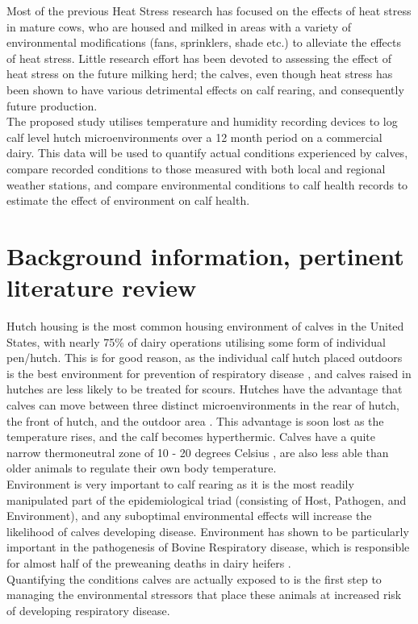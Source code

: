 \documentclass[12pt]{article}
\begin{document}
	Most of the previous Heat Stress research has focused on the effects of heat stress in mature cows, who are housed and milked in areas with a variety of environmental modifications (fans, sprinklers, shade etc.)  to alleviate the effects of heat stress.\cite{Armstrong1994}
	Little research effort has been devoted to assessing the effect of heat stress on the future milking herd; the calves, even though heat stress has been shown to have various detrimental effects on calf rearing, and consequently future production. \cite{Stott1976,lacetera1994,Hoffman1997}\\


	The proposed study utilises temperature and humidity recording devices to log calf level hutch microenvironments over a 12 month period on a commercial dairy. This data will be used to quantify actual conditions experienced by calves, compare recorded conditions to those measured with both local and regional weather stations, and compare environmental conditions to calf health records to estimate the effect of environment on calf health. 

	\newpage
	\section{Background information, pertinent literature review}
	Hutch housing is the most common housing environment of calves in the United States, with nearly 75\% of dairy operations utilising some form of individual pen/hutch.\cite{NAHMS2007}
	This is for good reason, as the individual calf hutch placed outdoors is the best environment for prevention of respiratory disease \cite{callan2002biosecurity}, and calves raised in hutches are less likely to be treated for scours. \cite{Waltner-Toews1986}
	Hutches have the advantage that calves can move between three distinct microenvironments in the rear of hutch, the front of hutch, and the outdoor area \cite{brunsvold1985}. 
	This advantage is soon lost as the temperature rises, and the calf becomes hyperthermic. Calves have a quite narrow thermoneutral zone of 10 - 20 degrees Celsius \cite{Gebremedhin1981}, are also less able than older animals to regulate their own body temperature.\cite{Christopherson1976}\\


	Environment is very important to calf rearing as it is the most readily manipulated part of the epidemiological triad (consisting of Host, Pathogen, and Environment\cite{CDC2012}), and any suboptimal environmental effects will increase the likelihood of calves developing disease. 
	Environment has shown to be particularly important in the pathogenesis of Bovine Respiratory disease\cite{Lago2006}, which is responsible for almost half of the preweaning deaths in dairy heifers \cite{NAHMS2007}.\\
	Quantifying the conditions calves are actually exposed to is the first step to managing the environmental stressors that place these animals at increased risk of developing respiratory disease. \\
	
\end{document}
